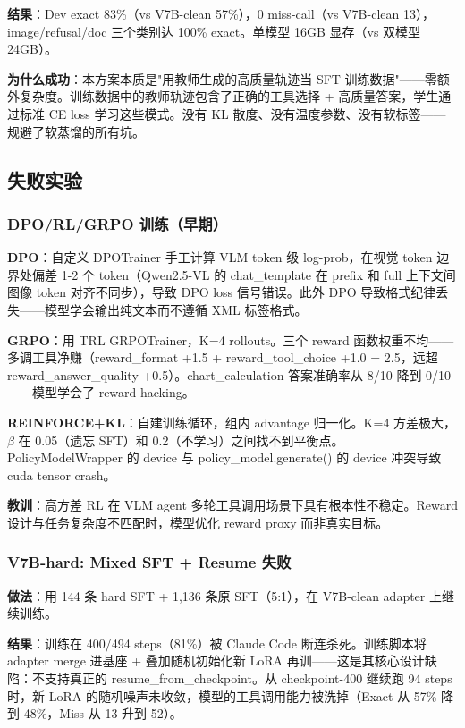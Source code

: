 \documentclass[12pt,a4paper]{ctexart}
\begin{document}
\textbf{结果}：Dev exact 83\%（vs V7B-clean 57\%），0 miss-call（vs V7B-clean 13），image/refusal/doc 三个类别达 100\% exact。单模型 16GB 显存（vs 双模型 24GB）。

\textbf{为什么成功}：本方案本质是"用教师生成的高质量轨迹当 SFT 训练数据"——零额外复杂度。训练数据中的教师轨迹包含了正确的工具选择 + 高质量答案，学生通过标准 CE loss 学习这些模式。没有 KL 散度、没有温度参数、没有软标签——规避了软蒸馏的所有坑。

\subsection{失败实验}

\subsubsection{DPO/RL/GRPO 训练（早期）}

\textbf{DPO}：自定义 DPOTrainer 手工计算 VLM token 级 log-prob，在视觉 token 边界处偏差 1-2 个 token（Qwen2.5-VL 的 chat\_template 在 prefix 和 full 上下文间图像 token 对齐不同步），导致 DPO loss 信号错误。此外 DPO 导致格式纪律丢失——模型学会输出纯文本而不遵循 XML 标签格式。

\textbf{GRPO}：用 TRL GRPOTrainer，K=4 rollouts。三个 reward 函数权重不均——多调工具净赚（reward\_format +1.5 + reward\_tool\_choice +1.0 = 2.5，远超 reward\_answer\_quality +0.5）。chart\_calculation 答案准确率从 8/10 降到 0/10——模型学会了 reward hacking。

\textbf{REINFORCE+KL}：自建训练循环，组内 advantage 归一化。K=4 方差极大，$\beta$ 在 0.05（遗忘 SFT）和 0.2（不学习）之间找不到平衡点。PolicyModelWrapper 的 device 与 policy\_model.generate() 的 device 冲突导致 cuda tensor crash。

\textbf{教训}：高方差 RL 在 VLM agent 多轮工具调用场景下具有根本性不稳定。Reward 设计与任务复杂度不匹配时，模型优化 reward proxy 而非真实目标。

\subsubsection{V7B-hard: Mixed SFT + Resume 失败}

\textbf{做法}：用 144 条 hard SFT + 1,136 条原 SFT（5:1），在 V7B-clean adapter 上继续训练。

\textbf{结果}：训练在 400/494 steps（81\%）被 Claude Code 断连杀死。训练脚本将 adapter merge 进基座 + 叠加随机初始化新 LoRA 再训——这是其核心设计缺陷：不支持真正的 resume\_from\_checkpoint。从 checkpoint-400 继续跑 94 steps 时，新 LoRA 的随机噪声未收敛，模型的工具调用能力被洗掉（Exact 从 57\% 降到 48\%，Miss 从 13 升到 52）。
\end{document}
